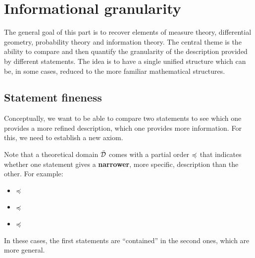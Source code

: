 \documentclass[11pt,letterpaper,fleqn]{memoir} %
\begin{document}
\section{Informational granularity}

The general goal of this part is to recover elements of measure theory, differential geometry, probability theory and information theory. The central theme is the ability to compare and then quantify the granularity of the description provided by different statements. The idea is to have a single unified structure which can be, in some cases, reduced to the more familiar mathematical structures.

\subsection{Statement fineness}

Conceptually, we want to be able to compare two statements to see which one provides a more refined description, which one provides more information. For this, we need to establish a new axiom.

Note that a theoretical domain $\bar{\mathcal{D}}$ comes with a partial order $\preccurlyeq$ that indicates whether one statement gives a \textbf{narrower}, more specific, description than the other. For example:
\begin{itemize}
	\item {} $\preccurlyeq$ 
	\item {} $\preccurlyeq$ 
	\item {} $\preccurlyeq$ 
\end{itemize}
In these cases, the first statements are ``contained'' in the second ones, which are more general.
\end{document}

